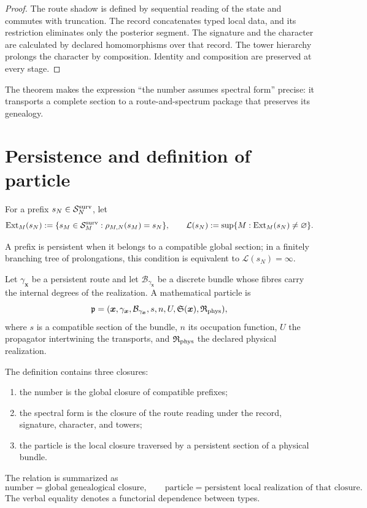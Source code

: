 \begin{proof}
The route shadow is defined by sequential reading of the state and commutes
with truncation. The record concatenates typed local data, and its
restriction eliminates only the posterior segment. The signature and the character
are calculated by declared homomorphisms over that record. The
tower hierarchy prolongs the character by composition. Identity and
composition are preserved at every stage.
\end{proof}

The theorem makes the expression “the number assumes spectral form” precise:
it transports a complete section to a route-and-spectrum package that preserves
its genealogy.

\section{Persistence and definition of particle}

For a prefix \(s_N\in\mathcal S_N^{\rm surv}\), let
\[
 \operatorname{Ext}_M(s_N)
 :=\{s_M\in\mathcal S_M^{\rm surv}:\rho_{M,N}(s_M)=s_N\},
 \qquad
 \mathcal L(s_N)
 :=\sup\{M:\operatorname{Ext}_M(s_N)\neq\varnothing\}.
\]

\begin{definition}[Persistence]
\label{def:persistencia-bisagra-numero-particula}
A prefix is persistent when it belongs to a compatible global section;
in a finitely branching tree of prolongations, this condition is equivalent
to \(\mathcal L(s_N)=\infty\).
\end{definition}

\begin{definition}
\label{def:particula-matematica-bisagra}
Let \(\gamma_{\boldsymbol x}\) be a persistent route and let
\(\mathcal B_{\gamma_{\boldsymbol x}}\) be a discrete bundle whose fibres
carry the internal degrees of the realization. A mathematical particle is
\[
 \mathfrak p=
 (\boldsymbol x,
  \gamma_{\boldsymbol x},
  \mathcal B_{\gamma_{\boldsymbol x}},
  s,n,U,
  \mathfrak S(\boldsymbol x),
  \mathfrak R_{\rm phys}),
\]
where \(s\) is a compatible section of the bundle, \(n\) its
occupation function, \(U\) the propagator intertwining the transports, and
\(\mathfrak R_{\rm phys}\) the declared physical realization.
\end{definition}

The definition contains three closures:
\begin{enumerate}
\item the number is the global closure of compatible prefixes;
\item the spectral form is the closure of the route reading under the record,
      signature, character, and towers;
\item the particle is the local closure traversed by a persistent section
      of a physical bundle.
\end{enumerate}
The relation is summarized as
\[
 \boxed{
 \text{number}=\text{global genealogical closure},
 \qquad
 \text{particle}=\text{persistent local realization of that closure}.}
\]
The verbal equality denotes a functorial dependence between types.

